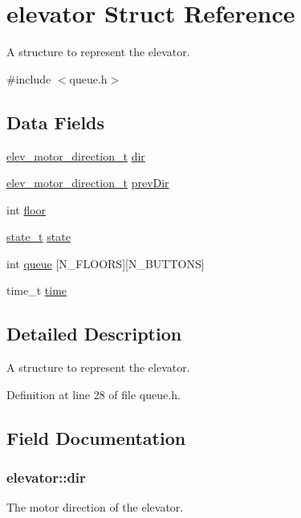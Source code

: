 \hypertarget{structelevator}{}\section{elevator Struct Reference}
\label{structelevator}


A structure to represent the elevator.  




{\ttfamily \#include $<$queue.\+h$>$}

\subsection*{Data Fields}
\begin{DoxyCompactItemize}
\item 
\hyperlink{elev_8h_a2256dfd58fecce253106f83fd2ed607f}{elev\+\_\+motor\+\_\+direction\+\_\+t} \hyperlink{structelevator_a562896901ac230df0705e18e098a7994}{dir}
\item 
\hyperlink{elev_8h_a2256dfd58fecce253106f83fd2ed607f}{elev\+\_\+motor\+\_\+direction\+\_\+t} \hyperlink{structelevator_a058f9c542d184cebcfdcd5b3370790ca}{prev\+Dir}
\item 
int \hyperlink{structelevator_a53d264d5584d1d5796a6dc36d67240cf}{floor}
\item 
\hyperlink{queue_8h_a2053ff352471e2844cd5fc2724a390bd}{state\+\_\+t} \hyperlink{structelevator_ace035615f55707c52cf604a135917b0a}{state}
\item 
int \hyperlink{structelevator_a64efa739ce2fff3d9ec918196a1ecf13}{queue} \mbox{[}N\+\_\+\+F\+L\+O\+O\+RS\mbox{]}\mbox{[}N\+\_\+\+B\+U\+T\+T\+O\+NS\mbox{]}
\item 
time\+\_\+t \hyperlink{structelevator_a7b0a2985b5ee51234ebe3b395d960921}{time}
\end{DoxyCompactItemize}


\subsection{Detailed Description}
A structure to represent the elevator. 

Definition at line 28 of file queue.\+h.



\subsection{Field Documentation}
\subsubsection[{\texorpdfstring{dir}{dir}}]{ elevator\+::dir}\hypertarget{structelevator_a562896901ac230df0705e18e098a7994}{}\label{structelevator_a562896901ac230df0705e18e098a7994}
The motor direction of the elevator. 

